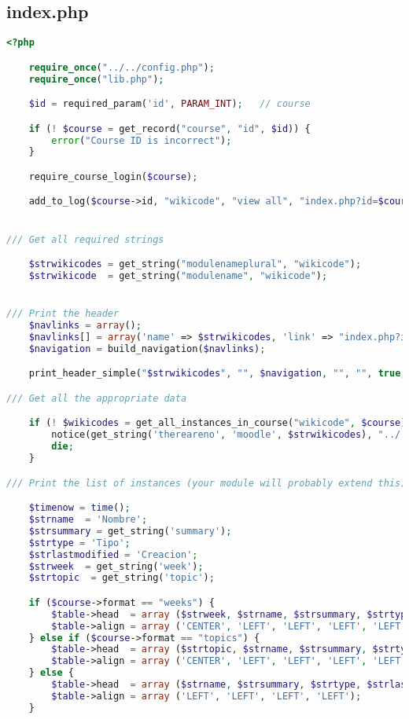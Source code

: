 \subsection{index.php}
\begin{lstlisting}[language=PHP]
<?php

    require_once("../../config.php");
    require_once("lib.php");

    $id = required_param('id', PARAM_INT);   // course

    if (! $course = get_record("course", "id", $id)) {
        error("Course ID is incorrect");
    }

    require_course_login($course);

    add_to_log($course->id, "wikicode", "view all", "index.php?id=$course->id", "");


/// Get all required strings

    $strwikicodes = get_string("modulenameplural", "wikicode");
    $strwikicode  = get_string("modulename", "wikicode");


/// Print the header
    $navlinks = array();
    $navlinks[] = array('name' => $strwikicodes, 'link' => "index.php?id=$course->id", 'type' => 'activity');
    $navigation = build_navigation($navlinks);

    print_header_simple("$strwikicodes", "", $navigation, "", "", true, "", navmenu($course));

/// Get all the appropriate data

    if (! $wikicodes = get_all_instances_in_course("wikicode", $course)) {
        notice(get_string('thereareno', 'moodle', $strwikicodes), "../../course/view.php?id=$course->id");
        die;
    }

/// Print the list of instances (your module will probably extend this)

    $timenow = time();
    $strname  = 'Nombre';
    $strsummary = get_string('summary');
    $strtype = 'Tipo';
    $strlastmodified = 'Creacion';
    $strweek  = get_string('week');
    $strtopic  = get_string('topic');

    if ($course->format == "weeks") {
        $table->head  = array ($strweek, $strname, $strsummary, $strtype, $strlastmodified);
        $table->align = array ('CENTER', 'LEFT', 'LEFT', 'LEFT', 'LEFT');
    } else if ($course->format == "topics") {
        $table->head  = array ($strtopic, $strname, $strsummary, $strtype, $strlastmodified);
        $table->align = array ('CENTER', 'LEFT', 'LEFT', 'LEFT', 'LEFT');
    } else {
        $table->head  = array ($strname, $strsummary, $strtype, $strlastmodified);
        $table->align = array ('LEFT', 'LEFT', 'LEFT', 'LEFT');
    }


\end{lstlisting}

